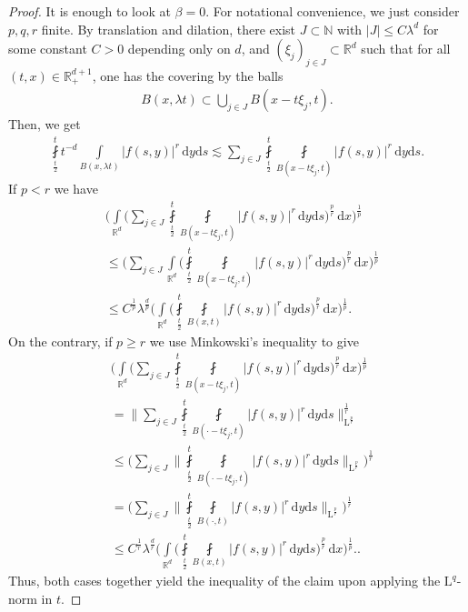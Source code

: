 \documentclass[11pt, leqno,parskip=half]{amsart}
\theoremstyle{definition}
\newcommand{\IR}{\mathbb{R}}
\newcommand{\IN}{\mathbb{N}}
\renewcommand{\L}{\mathrm{L}}
\renewcommand{\d}{\mathrm{d}}
\numberwithin{equation}{section}
\begin{document}
\begin{proof}
    It is enough to look at $\beta = 0$. For notational convenience, we just consider $p,q,r$ finite. 
    By translation and dilation, there exist $J\subset \IN$ with $|J| \leq C\lambda^d$ for some constant $C>0$ depending only on $d$, and $(\xi_j)_{j\in J}\subset \IR^d$ such that for all $(t,x)\in\IR^{d+1}_+$, one has the covering by the balls
    \begin{align*}
        B(x,\lambda t) \subset \bigcup_{j\in J} B(x-t\xi_j, t).
    \end{align*}
    Then, we get
    \begin{align*}
        \fint\limits_{\frac{t}{2}}^t t^{-d}\int\limits_{B(x,\lambda t)} |f(s,y)|^r \, \d y \d s\lesssim \sum\limits_{j\in J} \fint\limits_{\frac{t}{2}}^t \fint\limits_{B(x-t\xi_j, t)} |f(s,y)|^r \, \d y \d s.
    \end{align*}
    If $p<r$ we have
    \begin{align*}
        &\bigg(\int\limits_{\IR^d}\bigg( \sum\limits_{j\in J} \fint\limits_{\frac{t}{2}}^t \fint\limits_{B(x-t\xi_j, t)} |f(s,y)|^r \, \d y \d s\bigg)^\frac{p}{r}\,\d x \bigg)^\frac{1}{p}\\
        &\leq \bigg(\sum\limits_{j\in J} \int\limits_{\IR^d}\bigg(  \fint\limits_{\frac{t}{2}}^t \fint\limits_{B(x-t\xi_j, t)} |f(s,y)|^r \, \d y \d s\bigg)^\frac{p}{r}\,\d x \bigg)^\frac{1}{p}\\
        &\leq C^{\frac{1}{p}}\lambda^\frac{d}{p}\bigg( \int\limits_{\IR^d}\bigg(  \fint\limits_{\frac{t}{2}}^t \fint\limits_{B(x, t)} |f(s,y)|^r \, \d y \d s\bigg)^\frac{p}{r}\,\d x \bigg)^\frac{1}{p}.
    \end{align*}
    On the contrary, if $p\geq r$ we use Minkowski's inequality to give
    \begin{align*}
         &\bigg(\int\limits_{\IR^d}\bigg( \sum\limits_{j\in J} \fint\limits_{\frac{t}{2}}^t \fint\limits_{B(x-t\xi_j, t)} |f(s,y)|^r \, \d y \d s\bigg)^\frac{p}{r}\,\d x \bigg)^\frac{1}{p}\\
         &= \Big\|  \sum\limits_{j\in J} \fint\limits_{\frac{t}{2}}^t \fint\limits_{B(\cdot-t\xi_j, t)} |f(s,y)|^r \, \d y \d s \Big\|_{\L^{\frac{p}{r}}}^\frac{1}{r}\\
         &\leq  \bigg(\sum\limits_{j\in J}   \Big\|\fint\limits_{\frac{t}{2}}^t \fint\limits_{B(\cdot-t\xi_j, t)} |f(s,y)|^r \, \d y \d s\Big\|_{\L^{\frac{p}{r}}} \bigg)^\frac{1}{r}\\
         &=  \bigg(\sum\limits_{j\in J}   \Big\|\fint\limits_{\frac{t}{2}}^t \fint\limits_{B(\cdot, t)} |f(s,y)|^r \, \d y \d s\Big\|_{\L^{\frac{p}{r}}} \bigg)^\frac{1}{r}\\
         &\leq C^{\frac{1}{r}}\lambda^\frac{d}{r}\bigg( \int\limits_{\IR^d}\bigg(  \fint\limits_{\frac{t}{2}}^t \fint\limits_{B(x, t)} |f(s,y)|^r \, \d y \d s\bigg)^\frac{p}{r}\,\d x \bigg)^\frac{1}{p}..
    \end{align*}
    Thus, both cases together yield the inequality of the claim upon applying the $\L^q$-norm in $t$.
\end{proof}
\end{document}
